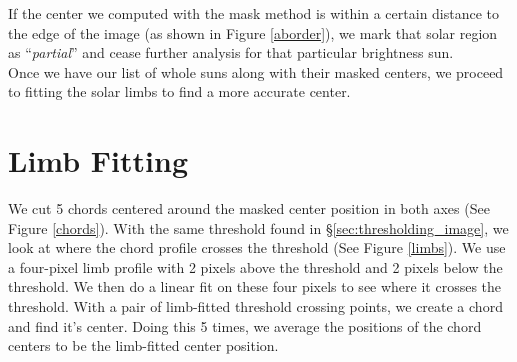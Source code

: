 \documentclass[10pt]{scrartcl}
\begin{document}
If the center we computed with the mask method is within a certain distance to the edge of the image (as shown in Figure \ref{aborder}), we mark that solar region as ``\emph{partial}'' and cease further analysis for that particular brightness sun. \\
\indent Once we have our list of whole suns along with their masked centers, we proceed to fitting the solar limbs to find a more accurate center.

\section{Limb Fitting} %
\label{sec:limb_fitting}

We cut 5 chords centered around the masked center position in both axes (See Figure \ref{chords}). With the same threshold found in \S \ref{sec:thresholding_image}, we look at where the chord profile crosses the threshold (See Figure \ref{limbs}). We use a four-pixel limb profile with 2 pixels above the threshold and 2 pixels below the threshold. We then do a linear fit on these four pixels to see where it crosses the threshold. With a pair of limb-fitted threshold crossing points, we create a chord and find it's center. Doing this 5 times, we average the positions of the chord centers to be the limb-fitted center position. 
\end{document}
